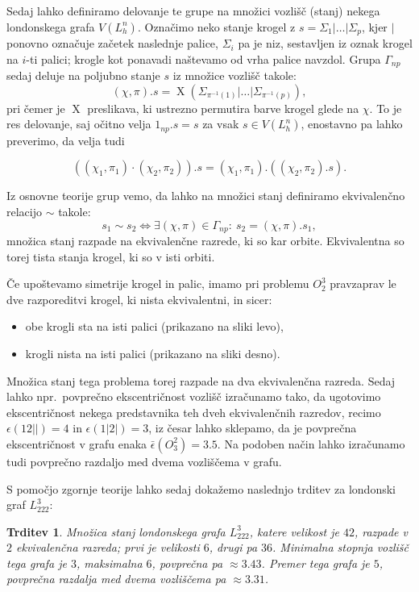\documentclass[11pt,a4paper]{article}
\theoremstyle{definition} %
\theoremstyle{plain} %
\newtheorem{trditev}[definicija]{Trditev}
\DeclareMathOperator {\X}{X}
\begin{document}
Sedaj lahko definiramo delovanje te grupe na množici vozlišč (stanj) nekega londonskega grafa $V(L_h^n)$. Označimo neko stanje krogel z $s = \Sigma_1 | \ldots | \Sigma_p$, kjer $|$ ponovno označuje začetek naslednje palice, $\Sigma_i$ pa je niz, sestavljen iz oznak krogel na $i$-ti palici; krogle kot ponavadi naštevamo od vrha palice navzdol. Grupa $\Gamma_{np}$ sedaj deluje na poljubno stanje $s$ iz množice vozlišč takole:
\[ (\chi,\pi) . s = \X \left( \Sigma_{\pi^{-1}(1)} | \ldots | \Sigma_{\pi^{-1}(p)} \right), \]
pri čemer je $\X$ preslikava, ki ustrezno permutira barve krogel glede na $\chi$. To je res delovanje, saj očitno velja $1_{np}.s = s$ za vsak $s \in V(L_h^n)$, enostavno pa lahko preverimo, da velja tudi

\[ \left((\chi_1,\pi_1) \cdot (\chi_2,\pi_2)\right).s = (\chi_1,\pi_1) . ((\chi_2,\pi_2).s) .\]

Iz osnovne teorije grup vemo, da lahko na množici stanj definiramo ekvivalenčno relacijo $\sim$ takole:
\[ s_1 \sim s_2 \iff \exists (\chi,\pi) \in \Gamma_{np}\colon \ s_2 = (\chi,\pi).s_1, \]
množica stanj razpade na ekvivalenčne razrede, ki so kar orbite. Ekvivalentna so torej tista stanja krogel, ki so v isti orbiti.

Če upoštevamo simetrije krogel in palic, imamo pri problemu $O_2^3$ pravzaprav le dve razporeditvi krogel, ki nista ekvivalentni, in sicer: 
\begin{itemize}
    \item obe krogli sta na isti palici (prikazano na sliki levo),
    \item krogli nista na isti palici (prikazano na sliki desno).
\end{itemize}

Množica stanj tega problema torej razpade na dva ekvivalenčna razreda. Sedaj lahko npr.\ povprečno ekscentričnost vozlišč izračunamo tako, da ugotovimo ekscentričnost nekega predstavnika teh dveh ekvivalenčnih razredov, recimo $\epsilon(12||) = 4$ in $\epsilon(1|2|) = 3$, iz česar lahko sklepamo, da je povprečna ekscentričnost v grafu enaka $\bar{\epsilon}(O^2_3) = 3.5$. Na podoben način lahko izračunamo tudi povprečno razdaljo med dvema vozliščema v grafu.

S pomočjo zgornje teorije lahko sedaj dokažemo naslednjo trditev za londonski graf $L_{222}^3$:

\medskip

\begin{trditev}
    \label{trd:simetrije-L222na3}
    Množica stanj londonskega grafa $L_{222}^3$, katere velikost je $42$, razpade v $2$ ekvivalenčna razreda; prvi je velikosti $6$, drugi pa $36$. Minimalna stopnja vozlišč tega grafa je $3$, maksimalna $6$, povprečna pa $\approx 3.43$. Premer tega grafa je $5$, povprečna razdalja med dvema vozliščema pa $\approx 3.31$. 
\end{trditev}
\end{document}
